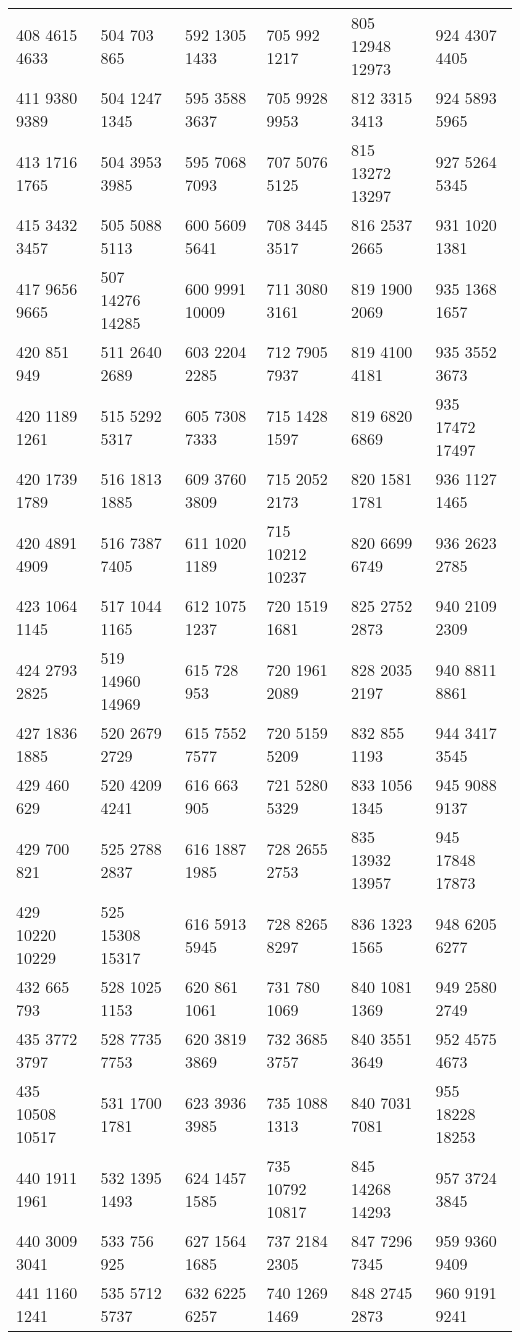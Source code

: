 \begin{center}
\begin{longtable}{llllll}
408 4615 4633&504 703 865&592 1305 1433&705 992 1217&805 12948 12973&924 4307 4405\\
411 9380 9389&504 1247 1345&595 3588 3637&705 9928 9953&812 3315 3413&924 5893 5965\\
413 1716 1765&504 3953 3985&595 7068 7093&707 5076 5125&815 13272 13297&927 5264 5345\\
415 3432 3457&505 5088 5113&600 5609 5641&708 3445 3517&816 2537 2665&931 1020 1381\\
417 9656 9665&507 14276 14285&600 9991 10009&711 3080 3161&819 1900 2069&935 1368 1657\\
420 851 949&511 2640 2689&603 2204 2285&712 7905 7937&819 4100 4181&935 3552 3673\\
420 1189 1261&515 5292 5317&605 7308 7333&715 1428 1597&819 6820 6869&935 17472 17497\\
420 1739 1789&516 1813 1885&609 3760 3809&715 2052 2173&820 1581 1781&936 1127 1465\\
420 4891 4909&516 7387 7405&611 1020 1189&715 10212 10237&820 6699 6749&936 2623 2785\\
423 1064 1145&517 1044 1165&612 1075 1237&720 1519 1681&825 2752 2873&940 2109 2309\\
424 2793 2825&519 14960 14969&615 728 953&720 1961 2089&828 2035 2197&940 8811 8861\\
427 1836 1885&520 2679 2729&615 7552 7577&720 5159 5209&832 855 1193&944 3417 3545\\
429 460 629&520 4209 4241&616 663 905&721 5280 5329&833 1056 1345&945 9088 9137\\
429 700 821&525 2788 2837&616 1887 1985&728 2655 2753&835 13932 13957&945 17848 17873\\
429 10220 10229&525 15308 15317&616 5913 5945&728 8265 8297&836 1323 1565&948 6205 6277\\
432 665 793&528 1025 1153&620 861 1061&731 780 1069&840 1081 1369&949 2580 2749\\
435 3772 3797&528 7735 7753&620 3819 3869&732 3685 3757&840 3551 3649&952 4575 4673\\
435 10508 10517&531 1700 1781&623 3936 3985&735 1088 1313&840 7031 7081&955 18228 18253\\
440 1911 1961&532 1395 1493&624 1457 1585&735 10792 10817&845 14268 14293&957 3724 3845\\
440 3009 3041&533 756 925&627 1564 1685&737 2184 2305&847 7296 7345&959 9360 9409\\
441 1160 1241&535 5712 5737&632 6225 6257&740 1269 1469&848 2745 2873&960 9191 9241\\

\end{longtable}
\end{center}
